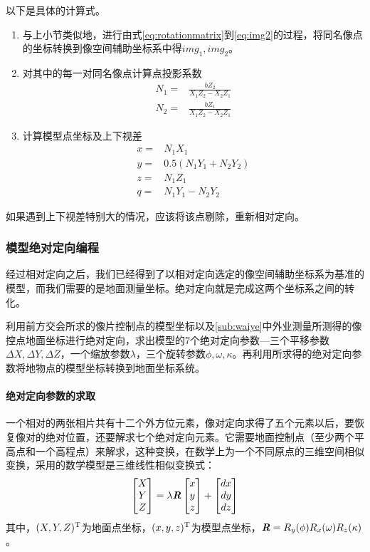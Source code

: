 以下是具体的计算式。

\begin{enumerate}
\item 与上小节类似地，进行由式\ref{eq:rotationmatrix}到\ref{eq:img2}的过程，将同名像点的坐标转换到像空间辅助坐标系中得$img_1,img_2$。
\item 对其中的每一对同名像点计算点投影系数
\begin{align}
N_1=& \frac{bZ_2}{X_1Z_2-X_2Z_1} \\
N_2=& \frac{bZ_1}{X_1Z_2-X_2Z_1}
\end{align}
\item 计算模型点坐标及上下视差
\begin{align}
x=& N_1X_1 \\
y=& 0.5(N_1Y_1+N_2Y_2) \\
z=& N_1Z_1 \\
q=& N_1Y_1-N_2Y_2
\end{align}
\end{enumerate}

\begin{note}
如果遇到上下视差特别大的情况，应该将该点剔除，重新相对定向。
\end{note}

\subsubsection{模型绝对定向编程}

经过相对定向之后，我们已经得到了以相对定向选定的像空间辅助坐标系为基准的模型，而我们需要的是地面测量坐标。绝对定向就是完成这两个坐标系之间的转化。

利用前方交会所求的像片控制点的模型坐标以及\ref{sub:waiye}中外业测量所测得的像控点地面坐标进行绝对定向，求出模型的7个绝对定向参数---三个平移参数$\Delta X,\Delta Y,\Delta Z$，一个缩放参数$\lambda$，三个旋转参数$\phi,\omega,\kappa$。再利用所求得的绝对定向参数将地物点的模型坐标转换到地面坐标系统。

\paragraph{绝对定向参数的求取}一个相对的两张相片共有十二个外方位元素，像对定向求得了五个元素以后，要恢复像对的绝对位置，还要解求七个绝对定向元素。它需要地面控制点（至少两个平高点和一个高程点）来解求，这种变换，在数学上为一个不同原点的三维空间相似变换，采用的数学模型是三维线性相似变换式：
\begin{equation}
\begin{bmatrix}
X \\ Y \\ Z
\end{bmatrix}=
\lambda\boldsymbol{\mathit{R}}\begin{bmatrix}
x \\ y \\ z
\end{bmatrix}+
\begin{bmatrix}
dx \\
dy \\
dz
\end{bmatrix}
\label{eq:similar}
\end{equation}
其中，$(X,Y,Z)^\mathrm{T}$为地面点坐标，$(x,y,z)^\mathrm{T}$为模型点坐标，$\boldsymbol{\mathit{R}}=R_y(\phi)R_x(\omega)R_z(\kappa)$。

